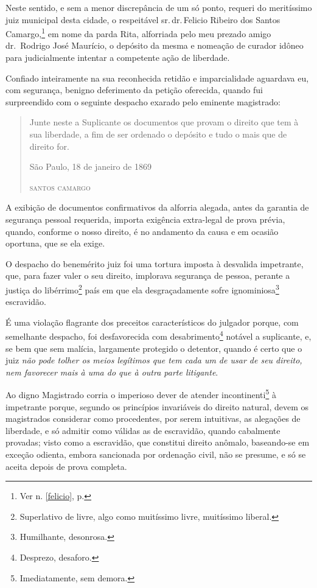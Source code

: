 Neste sentido, e sem a menor discrepância de um só ponto, requeri do
meritíssimo juiz municipal desta cidade, o respeitável sr.\,dr.\,Felicio
Ribeiro dos Santos Camargo,\footnote{Ver n. \ref{felicio}, p. \pageref{felicio}} 
em nome da parda Rita, alforriada pelo meu prezado amigo dr.~Rodrigo 
José Maurício, o depósito da mesma e nomeação de curador idôneo
para judicialmente intentar a competente ação de liberdade.

Confiado inteiramente na sua reconhecida retidão e imparcialidade
aguardava eu, com segurança, benigno deferimento da petição oferecida,
quando fui surpreendido com o seguinte despacho exarado pelo eminente
magistrado:

\begin{quote}
Junte neste a Suplicante os documentos que provam o direito que
tem à sua liberdade, a fim de ser ordenado o depósito e tudo o mais que
de direito for.

\begin{flushright}
São Paulo, 18 de janeiro de 1869

\textsc{santos camargo}
\end{flushright}
\end{quote}

A exibição de documentos confirmativos da alforria alegada, antes da
garantia de segurança pessoal requerida, importa exigência extra-legal
de prova prévia, quando, conforme o nosso direito, é no andamento da
causa e em ocasião oportuna, que se ela exige.

O despacho do benemérito juiz foi uma tortura imposta à desvalida
impetrante, que, para fazer valer o seu direito, implorava segurança de
pessoa, perante a justiça do libérrimo\footnote{Superlativo de livre,
  algo como muitíssimo livre, muitíssimo liberal.} país em que ela
desgraçadamente sofre ignominiosa\footnote{Humilhante, desonrosa.}
escravidão.

É uma violação flagrante dos preceitos característicos do julgador
porque, com semelhante despacho, foi desfavorecida com
desabrimento\footnote{Desprezo, desaforo.} notável a suplicante, e, se
bem que sem malícia, largamente protegido o detentor, quando é certo que
o juiz \emph{não pode tolher os meios legítimos que tem cada um de usar
de seu direito, nem favorecer mais à uma do que à outra parte
litigante}.

Ao digno Magistrado corria o imperioso dever de atender
incontinenti\footnote{Imediatamente, sem demora.} à impetrante porque,
segundo os princípios invariáveis do direito natural, devem os
magistrados considerar como procedentes, por serem intuitivas, as
alegações de liberdade, e só admitir como válidas as de escravidão,
quando cabalmente provadas; visto como a escravidão, que constitui
direito anômalo, baseando-se em exceção odienta, embora sancionada por
ordenação civil, não se presume, e só se aceita depois de prova
completa.

